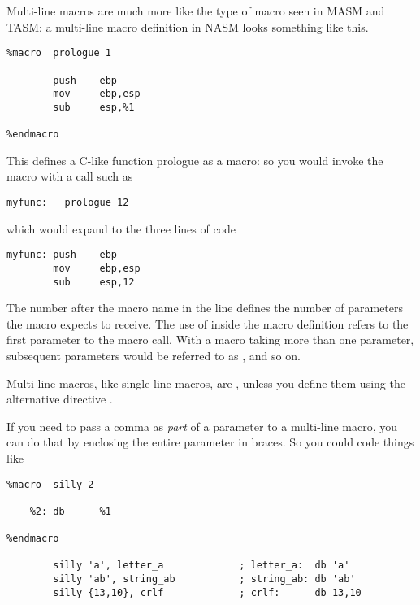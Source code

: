 
Multi-line macros are much more like the type of macro seen in MASM
and TASM: a multi-line macro definition in NASM looks something like
this.

\begin{lstlisting}
%macro  prologue 1

        push    ebp
        mov     ebp,esp
        sub     esp,%1

%endmacro
\end{lstlisting}

This defines a C-like function prologue as a macro: so you would
invoke the macro with a call such as

\begin{lstlisting}
myfunc:   prologue 12
\end{lstlisting}

which would expand to the three lines of code

\begin{lstlisting}
myfunc: push    ebp
        mov     ebp,esp
        sub     esp,12
\end{lstlisting}

The number  after the macro name in the  line
defines the number of parameters the macro  expects
to receive. The use of  inside the macro definition refers
to the first parameter to the macro call. With a macro taking more
than one parameter, subsequent parameters would be referred to as
,  and so on.

Multi-line macros, like single-line macros, are ,
unless you define them using the alternative directive .

If you need to pass a comma as \emph{part} of a parameter to a
multi-line macro, you can do that by enclosing the entire parameter
in braces. So you could code
things like

\begin{lstlisting}
%macro  silly 2

    %2: db      %1

%endmacro

        silly 'a', letter_a             ; letter_a:  db 'a'
        silly 'ab', string_ab           ; string_ab: db 'ab'
        silly {13,10}, crlf             ; crlf:      db 13,10
\end{lstlisting}


